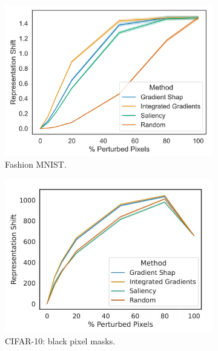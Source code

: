 \begin{figure}
     \centering
     \begin{subfigure}[b]{0.3\textwidth}
         \centering
         \includegraphics[width=\textwidth]{images/feature_consistency_fmnist.png}
         \caption{Fashion MNIST.}
         \label{fig:fashion_mnist_f_imp}
     \end{subfigure}
     \hfill
     \begin{subfigure}[b]{0.3\textwidth}
         \centering
         \includegraphics[width=\textwidth]{images/black pixels.png}
         \caption{CIFAR-10: black pixel masks.}
         \label{black_pixels}
     \end{subfigure}
     \hfill
     \begin{subfigure}[b]{0.3\textwidth}

\end{subfigure}
\end{figure}

